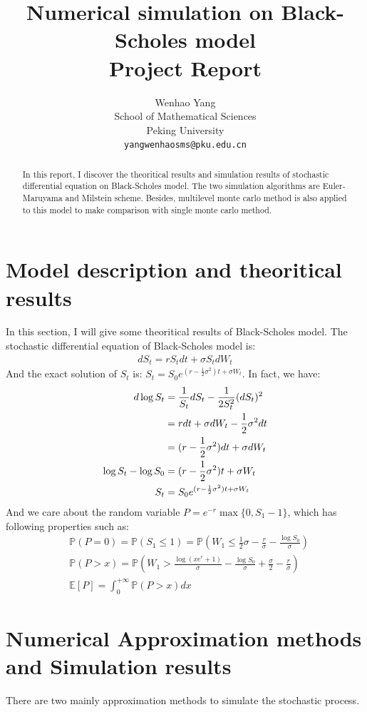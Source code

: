 \documentclass{article} %
\title{Numerical simulation on Black-Scholes model \\ Project Report}
\author{Wenhao Yang\\
School of Mathematical Sciences\\
Peking University\\
\texttt{yangwenhaosms@pku.edu.cn} \\
}
\begin{document}
\graphicspath{{../result/}}
\maketitle

\begin{abstract}
In this report, I discover the theoritical results and simulation results of stochastic differential equation on Black-Scholes model. The two simulation algorithms are Euler-Maruyama and Milstein scheme. Besides, multilevel monte carlo method is also applied to this model to make comparison with single monte carlo method.
\end{abstract}

\section{Model description and theoritical results}
In this section, I will give some theoritical results of Black-Scholes model. The stochastic differential equation of Black-Scholes model is:
\begin{align}
  dS_{t}=rS_{t}dt+\sigma S_{t}dW_{t}
\end{align}
And the exact solution of $S_{t}$ is: $S_{t}=S_{0}e^{(r-\frac{1}{2}\sigma^{2})t+\sigma W_{t}}$. In fact, we have:
\begin{align}
  d\log S_{t}&=\frac{1}{S_{t}}dS_{t}-\frac{1}{2S^{2}_{t}}(dS_{t})^{2}\notag\\
  &=rdt+\sigma dW_{t}-\frac{1}{2}\sigma^{2}dt\notag\\
  &=(r-\frac{1}{2}\sigma^{2})dt+\sigma dW_{t}\\
  \log S_{t}-\log S_{0}&=(r-\frac{1}{2}\sigma^{2})t+\sigma W_{t}\\
  S_{t}&=S_{0}e^{(r-\frac{1}{2}\sigma^{2})t+\sigma W_{t}}
\end{align}
And we care about the random variable $P=e^{-r}\max\{0,S_{1}-1\}$, which has following properties such as:
\begin{align}
  &\mathbb{P}(P=0)=\mathbb{P}(S_{1}\le 1)=\mathbb{P}(W_{1}\le\frac{1}{2}\sigma-\frac{r}{\sigma}-\frac{\log S_{0}}{\sigma})\\
  &\mathbb{P}(P>x)=\mathbb{P}(W_{1}>\frac{\log(xe^{r}+1)}{\sigma}-\frac{\log S_{0}}{\sigma}+\frac{\sigma}{2}-\frac{r}{\sigma})\\
  &\mathbb{E}[P]=\int_{0}^{+\infty}\mathbb{P}(P>x)dx
\end{align}
\section{Numerical Approximation methods and Simulation results}
There are two mainly approximation methods to simulate the stochastic process.
\end{document}
